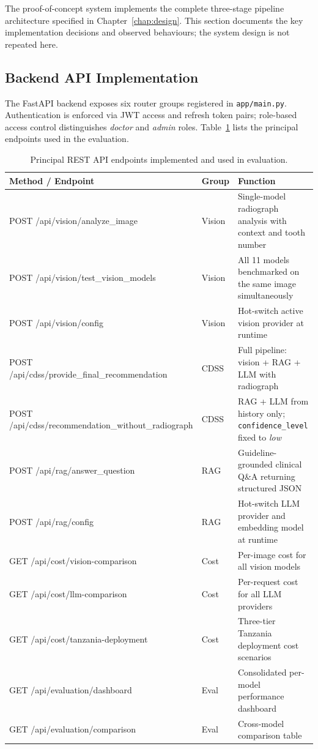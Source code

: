 \documentclass[12pt,a4paper]{report}
\begin{document}
The proof-of-concept system implements the complete three-stage pipeline
architecture specified in Chapter~\ref{chap:design}.  This section documents the key
implementation decisions and observed behaviours; the system design is
not repeated here.

\subsection{Backend API Implementation}
\label{subsec:api_impl}

The FastAPI backend exposes six router groups registered in
\texttt{app/main.py}.  Authentication is enforced via JWT access and
refresh token pairs; role-based access control distinguishes
\textit{doctor} and \textit{admin} roles.  Table~\ref{tab:endpoints}
lists the principal endpoints used in the evaluation.

\begin{table}[H]
\centering
\caption{Principal REST API endpoints implemented and used in evaluation.}
\label{tab:endpoints}
\small
\renewcommand{\arraystretch}{1.2}
\begin{tabularx}{\textwidth}{@{}l l X@{}}
\toprule
\textbf{Method / Endpoint} & \textbf{Group} & \textbf{Function} \\
\midrule
POST /api/vision/analyze\_image                    & Vision & Single-model radiograph analysis with context and tooth number \\
POST /api/vision/test\_vision\_models              & Vision & All 11 models benchmarked on the same image simultaneously \\
POST /api/vision/config                            & Vision & Hot-switch active vision provider at runtime \\
POST /api/cdss/provide\_final\_recommendation      & CDSS   & Full pipeline: vision + RAG + LLM with radiograph \\
POST /api/cdss/recommendation\_without\_radiograph & CDSS   & RAG + LLM from history only; \texttt{confidence\_level} fixed to \textit{low} \\
POST /api/rag/answer\_question                     & RAG    & Guideline-grounded clinical Q\&A returning structured JSON \\
POST /api/rag/config                               & RAG    & Hot-switch LLM provider and embedding model at runtime \\
GET  /api/cost/vision-comparison                   & Cost   & Per-image cost for all vision models \\
GET  /api/cost/llm-comparison                      & Cost   & Per-request cost for all LLM providers \\
GET  /api/cost/tanzania-deployment                 & Cost   & Three-tier Tanzania deployment cost scenarios \\
GET  /api/evaluation/dashboard                     & Eval   & Consolidated per-model performance dashboard \\
GET  /api/evaluation/comparison                    & Eval   & Cross-model comparison table \\
\bottomrule
\end{tabularx}
\end{table}
\end{document}

